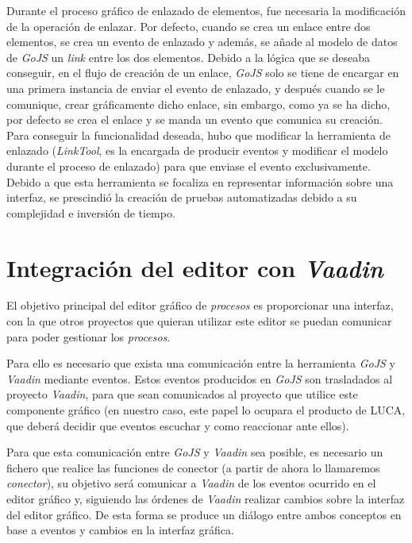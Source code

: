 Durante el proceso gráfico de enlazado de elementos, fue necesaria la modificación de la operación de enlazar. Por defecto, cuando se crea un enlace entre dos elementos, se crea un evento de enlazado y además, se añade al modelo de datos de \emph{GoJS} un \emph{link} entre los dos elementos. Debido a la lógica que se deseaba conseguir, en el flujo de creación de un enlace, \emph{GoJS} solo se tiene de encargar en una primera instancia de enviar el evento de enlazado, y después cuando se le comunique, crear gráficamente dicho enlace, sin embargo, como ya se ha dicho, por defecto se crea el enlace y se manda un evento que comunica su creación. Para conseguir la funcionalidad deseada, hubo que modificar la herramienta de enlazado (\emph{LinkTool}, es la encargada de producir eventos y modificar el modelo durante el proceso de enlazado) para que enviase el evento exclusivamente.
Debido a que esta herramienta se focaliza en representar información sobre una interfaz, se prescindió la creación de pruebas automatizadas debido a su complejidad e inversión de tiempo. 

\section{Integración del editor con \emph{Vaadin}}

El objetivo principal del editor gráfico de \emph{procesos} es proporcionar una interfaz, con la que otros proyectos que quieran utilizar este editor se puedan comunicar para poder gestionar los \emph{procesos}.

Para ello es necesario que exista una comunicación entre la herramienta \emph{GoJS} y \emph{Vaadin} mediante eventos. Estos eventos producidos en \emph{GoJS} son trasladados al proyecto \emph{Vaadin}, para que sean comunicados al proyecto que utilice este componente gráfico (en nuestro caso, este papel lo ocupara el producto de LUCA, que deberá decidir que eventos escuchar y como reaccionar ante ellos).

Para que esta comunicación entre \emph{GoJS} y \emph{Vaadin} sea posible, es necesario un fichero que realice las funciones de conector (a partir de ahora lo llamaremos \emph{conector}), su objetivo será comunicar a \emph{Vaadin} de los eventos ocurrido en el editor gráfico y, siguiendo las órdenes de \emph{Vaadin} realizar cambios sobre la interfaz del editor gráfico. De esta forma se produce un diálogo entre ambos conceptos en base a eventos y cambios en la interfaz gráfica.


